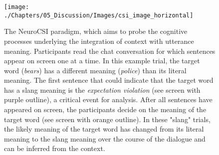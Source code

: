 \begin{figure}[!h]
	\centering
	\hspace*{-0.7cm}
	\texttt{[image: ./Chapters/05\_Discussion/Images/csi\_image\_horizontal]}
	\caption{The NeuroCSI paradigm, which aims to probe the cognitive processes underlying the integration of context with utterance meaning. Participants read the chat conversation for which sentences appear on screen one at a time. In this example trial, the target word (\textit{bears}) has a different meaning (\textit{police}) than its literal meaning. The first sentence that could indicate that the target word has a slang meaning is the \textit{expectation violation} (see screen with purple outline), a critical event for analysis. After all sentences have appeared on screen, the participants decide on the meaning of the target word (see screen with orange outline). In these "slang" trials, the likely meaning of the target word has changed from its literal meaning to the slang meaning over the course of the dialogue and can be inferred from the context. }
    \vspace*{-10pt}
	\label{fig:csi}
\end{figure}